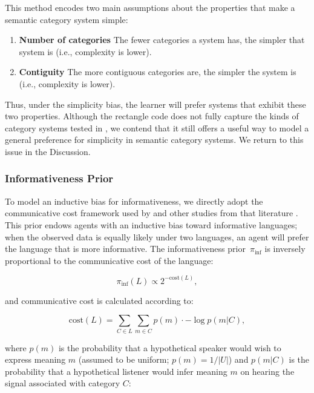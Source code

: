 \documentclass[doc,biblatex]{apa7}
\begin{document}
This method encodes two main assumptions about the properties that make a semantic category system simple:

	\begin{enumerate}
		\item \textbf{Number of categories} The fewer categories a system has, the simpler that system is (i.e., complexity is lower).
		\item \textbf{Contiguity} The more contiguous categories are, the simpler the system is (i.e., complexity is lower).
	\end{enumerate}

\noindent Thus, under the simplicity bias, the learner will prefer systems that exhibit these two properties. Although the rectangle code does not fully capture the kinds of category systems tested in \textcite{Carstensen:2015}, we contend that it still offers a useful way to model a general preference for simplicity in semantic category systems. We return to this issue in the Discussion.

\subsubsection{Informativeness Prior}

To model an inductive bias for informativeness, we directly adopt the communicative cost framework used by \textcite{Carstensen:2015} and other studies from that literature \parencite[e.g.,][]{Regier:2015}. This prior endows agents with an inductive bias toward informative languages; when the observed data is equally likely under two languages, an agent will prefer the language that is more informative. The informativeness prior~$\pi_\mathrm{inf}$ is inversely proportional to the communicative cost of the language:

	\begin{equation}
	\pi_\mathrm{inf}(L) \propto 2^{-\mathrm{cost}(L)},
	\label{prior_inf}
	\end{equation}

\noindent and communicative cost is calculated according to:

	\begin{equation}
	\mathrm{cost}(L) = \sum_{C \in L} \sum_{m \in C} p(m) \cdot -\log p(m|C),
	\label{cost}
	\end{equation}

\noindent where $p(m)$ is the probability that a hypothetical speaker would wish to express meaning $m$ (assumed to be uniform; $p(m) = 1/|U|$) and $p(m|C)$ is the probability that a hypothetical listener would infer meaning $m$ on hearing the signal associated with category $C$:
\end{document}
